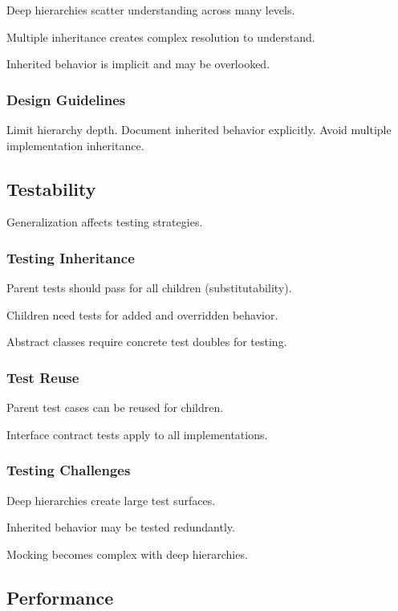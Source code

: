 \documentclass[11pt]{article}
\begin{document}
Deep hierarchies scatter understanding across many levels.

Multiple inheritance creates complex resolution to understand.

Inherited behavior is implicit and may be overlooked.

\subsubsection{Design Guidelines}

Limit hierarchy depth. Document inherited behavior explicitly. Avoid multiple implementation inheritance.

\subsection{Testability}

Generalization affects testing strategies.

\subsubsection{Testing Inheritance}

Parent tests should pass for all children (substitutability).

Children need tests for added and overridden behavior.

Abstract classes require concrete test doubles for testing.

\subsubsection{Test Reuse}

Parent test cases can be reused for children.

Interface contract tests apply to all implementations.

\subsubsection{Testing Challenges}

Deep hierarchies create large test surfaces.

Inherited behavior may be tested redundantly.

Mocking becomes complex with deep hierarchies.

\subsection{Performance}
\end{document}
